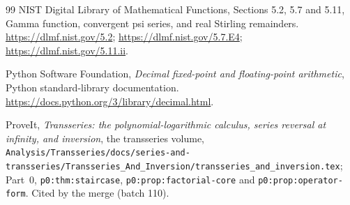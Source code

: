 \documentclass[11pt]{article}
\theoremstyle{remark}\newtheorem{remark}[theorem]{Remark}
\newcommand{\file}[1]{\nolinkurl{#1}}
\begin{document}
\begin{thebibliography}{99}
NIST Digital Library of Mathematical Functions, Sections 5.2, 5.7 and 5.11,
Gamma function, convergent psi series, and real Stirling remainders.
\url{https://dlmf.nist.gov/5.2};
\url{https://dlmf.nist.gov/5.7.E4};
\url{https://dlmf.nist.gov/5.11.ii}.

Python Software Foundation, \emph{Decimal fixed-point and floating-point
arithmetic}, Python standard-library documentation.
\url{https://docs.python.org/3/library/decimal.html}.

 ProveIt, \emph{Transseries: the polynomial-logarithmic calculus, series reversal at infinity, and inversion}, the transseries volume, \file{Analysis/Transseries/docs/series-and-transseries/Transseries_And_Inversion/transseries_and_inversion.tex}; Part~0, \file{p0:thm:staircase}, \file{p0:prop:factorial-core} and \file{p0:prop:operator-form}. Cited by the merge (batch 110).
\end{thebibliography}
\end{document}

